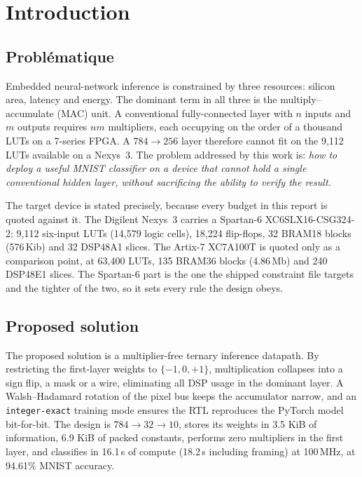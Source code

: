 \documentclass[11pt,a4paper]{article}
\begin{document}
\newpage
\section{Introduction}
\label{sec:intro}

\subsection{Probl\'ematique}
\label{sec:problematique}

Embedded neural-network inference is constrained by three resources: silicon
area, latency and energy. The dominant term in all three is the
multiply--accumulate (MAC) unit. A conventional fully-connected layer with
$n$ inputs and $m$ outputs requires $nm$ multipliers, each occupying on the
order of a thousand LUTs on a 7-series FPGA. A $784 \rightarrow 256$ layer
therefore cannot fit on the 9{,}112 LUTs available on a Nexys~3. The problem
addressed by this work is: \emph{how to deploy a
useful MNIST classifier on a device that cannot hold a single conventional
hidden layer, without sacrificing the ability to verify the result.}

The target device is stated precisely, because every budget in this report is
quoted against it. The Digilent Nexys~3 carries a Spartan-6 XC6SLX16-CSG324-2:
9{,}112 six-input LUTs (14{,}579 logic cells), 18{,}224 flip-flops, 32 BRAM18
blocks (576\,Kib) and 32 DSP48A1 slices. The Artix-7 XC7A100T is quoted only as
a comparison point, at 63{,}400 LUTs, 135 BRAM36 blocks (4.86\,Mb) and 240
DSP48E1 slices. The Spartan-6 part is the one the shipped constraint file
targets and the tighter of the two, so it sets every rule the design obeys.

\subsection{Proposed solution}
\label{sec:solution}

The proposed solution is a multiplier-free ternary inference datapath. By
restricting the first-layer weights to $\{-1,0,+1\}$, multiplication collapses
into a sign flip, a mask or a wire, eliminating all DSP usage in the dominant
layer. A Walsh--Hadamard rotation of the pixel bus keeps the accumulator
narrow, and an \texttt{integer-exact} training mode ensures the RTL reproduces
the PyTorch model bit-for-bit. The design is $784 \rightarrow 32 \rightarrow 10$,
stores its weights in 3.5 KiB of information, 6.9 KiB of packed constants,
performs zero multipliers in the first layer, and
classifies in 16.1\,\textmu s of compute (18.2\,\textmu s including
framing) at 100\,MHz, at 94.61\% MNIST accuracy.
\end{document}

